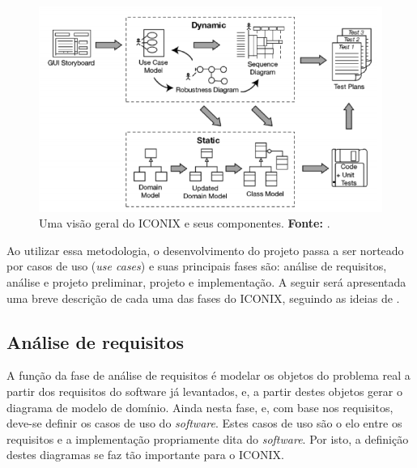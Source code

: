 \begin{figure}[h!]
	\centerline{\includegraphics[scale=0.95]{./imagens/visao_geral_iconix.png}}
	\caption[Uma visão geral do ICONIX e seus componentes.]
	{Uma visão geral do ICONIX e seus componentes. \textbf{Fonte:} .}
	\label{fig:visao_geral_iconix_componentes}
\end{figure}

\newpage %

\par Ao utilizar essa metodologia, o desenvolvimento do projeto passa a ser norteado por casos de uso (\textit{use cases}) e suas principais fases são: análise de requisitos, análise e projeto preliminar, projeto e implementação. A seguir será apresentada uma breve descrição de cada uma das fases do ICONIX, seguindo as ideias de .

\subsection{Análise de requisitos}

A função da fase de análise de requisitos é modelar os objetos do problema real a partir dos requisitos do software já levantados, e, a partir destes objetos gerar o diagrama de modelo de domínio. Ainda nesta fase, e, com base nos requisitos, deve-se definir os casos de uso do \textit{software}. Estes casos de uso são o elo entre os requisitos e a implementação propriamente dita do \textit{software}. Por isto, a definição destes diagramas se faz tão importante para o ICONIX. 


